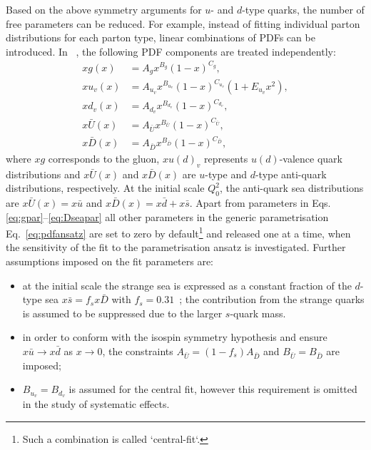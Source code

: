Based on the above symmetry arguments for $u$- and $d$-type quarks, the number of free parameters can be reduced. For example, instead of fitting individual parton distributions for each parton type, linear combinations of PDFs can be introduced.  In ~\cite{Aaron:2009aa}, the following PDF components are treated independently:
\begin{align}
 xg\left(x\right) &= A_gx^{B_g}\left(1-x\right)^{C_g}, \label{eq:gpar} \\
 xu_v\left(x\right) &= A_{u_v}x^{B_{u_v}}\left(1-x\right)^{C_{u_v}}\left(1+E_{u_v}x^2\right),\\
 xd_v\left(x\right) &= A_{d_v}x^{B_{d_v}}\left(1-x\right)^{C_{d_v}},\\
 x\bar{U}\left(x\right) &= A_{\bar{U}}x^{B_{\bar{U}}}\left(1-x\right)^{C_{\bar{U}}},\\
 x\bar{D}\left(x\right) &= A_{\bar{D}}x^{B_{\bar{D}}}\left(1-x\right)^{C_{\bar{D}}}, \label{eq:Dseapar}
\end{align}
where $xg$ corresponds to the gluon, $xu\left(d\right)_v$ represents $u\left(d\right)$-valence quark distributions and $x\bar{U}\left(x\right)$ and $x\bar{D}\left(x\right)$ are $u$-type and $d$-type anti-quark distributions, respectively. At the initial scale $Q^2_0$, the anti-quark sea distributions are $x\bar{U}\left(x\right)=x\bar u$ and $x\bar{D}\left(x\right)=x\bar d+x\bar s$. Apart from parameters in Eqs.\eqref{eq:gpar}--\eqref{eq:Dseapar} all other parameters in the generic parametrisation Eq.~\eqref{eq:pdfansatz} are set to zero by default\footnote{Such a combination is called `central-fit`.} and released one at a time, when the sensitivity of the fit to the parametrisation ansatz is investigated. Further assumptions imposed on the fit parameters are:
\begin{itemize}
 \item at the initial scale the strange sea is expressed as a constant fraction of the $d$-type sea $x\bar s=f_s x \bar D$ with $f_s=0.31$~\cite{Martin:2009iq,Nadolsky:2008zw}; the contribution from the strange quarks is assumed to be suppressed due to the larger $s$-quark mass.
 \item in order to conform with the isospin symmetry hypothesis and ensure $x\bar u \rightarrow x\bar d$ as $x\rightarrow 0$, the constraints $A_{\bar U}=\left(1-f_s\right)A_{\bar D}$ and $B_{\bar{U}}=B_{\bar{D}}$ are imposed;
 \item $B_{u_v}=B_{d_v}$ is assumed for the central fit, however this requirement is omitted in the study of systematic effects.
\end{itemize}
